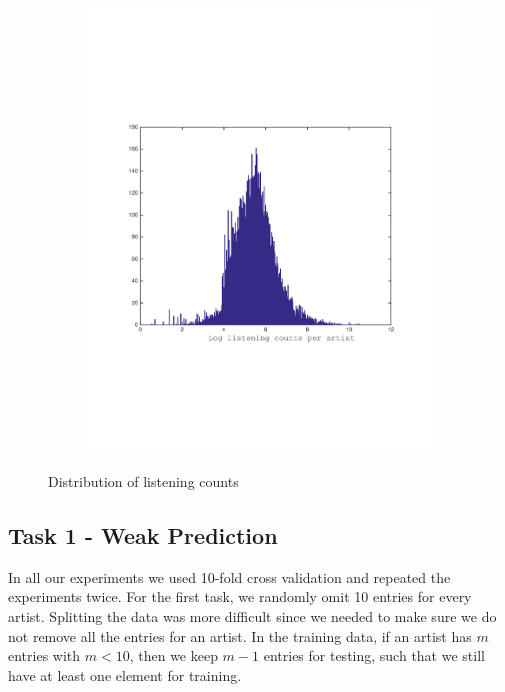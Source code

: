 \begin{figure}[h]
\begin{subfigure}[b]{0.40\textwidth}
    \caption{}
  \end{subfigure}
  \begin{subfigure}[b]{0.40\textwidth}
    \includegraphics[width=\textwidth]{figures/histCountPerArtist.pdf}
    \caption{}
  \end{subfigure}
  \caption{Distribution of listening counts}
  \label{fig:user_artist_distribution}
\end{figure}

 
\subsection{Task 1 - Weak Prediction}
In all our experiments we used 10-fold cross validation and repeated the experiments twice. For the first task, we randomly omit 10 entries for every artist. Splitting the data was more difficult since we needed to make sure we do not remove all the entries for an artist. In the training data, if an artist has $m$ entries with $m < 10$, then we keep $m-1$ entries for testing, such that we still have at least one element for training.
 
